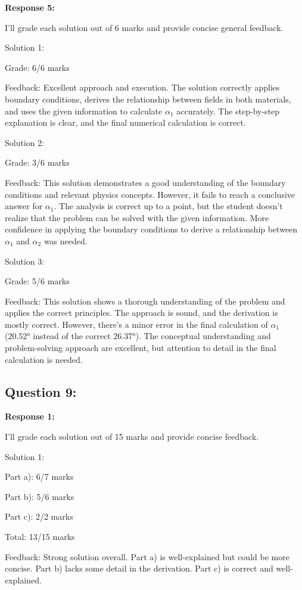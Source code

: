 \documentclass[a4paper,11pt]{article}
\begin{document}
\bigskip
\textbf{Response 5:}

I'll grade each solution out of 6 marks and provide concise general feedback.

Solution 1:

Grade: 6/6 marks

Feedback: Excellent approach and execution. The solution correctly applies boundary conditions, derives the relationship between fields in both materials, and uses the given information to calculate \(\alpha_1\) accurately. The step-by-step explanation is clear, and the final numerical calculation is correct.

Solution 2:

Grade: 3/6 marks

Feedback: This solution demonstrates a good understanding of the boundary conditions and relevant physics concepts. However, it fails to reach a conclusive answer for \(\alpha_1\). The analysis is correct up to a point, but the student doesn't realize that the problem can be solved with the given information. More confidence in applying the boundary conditions to derive a relationship between \(\alpha_1\) and \(\alpha_2\) was needed.

Solution 3:

Grade: 5/6 marks

Feedback: This solution shows a thorough understanding of the problem and applies the correct principles. The approach is sound, and the derivation is mostly correct. However, there's a minor error in the final calculation of \(\alpha_1\) (20.52° instead of the correct 26.37°). The conceptual understanding and problem-solving approach are excellent, but attention to detail in the final calculation is needed.

\subsection*{Question 9:}

\textbf{Response 1:}

I'll grade each solution out of 15 marks and provide concise feedback.

Solution 1:

Part a): 6/7 marks

Part b): 5/6 marks

Part c): 2/2 marks

Total: 13/15 marks

Feedback: Strong solution overall. Part a) is well-explained but could be more concise. Part b) lacks some detail in the derivation. Part c) is correct and well-explained.
\end{document}

